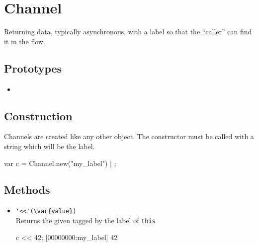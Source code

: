 \section{Channel}
Returning data, typically asynchronous, with a label so that the
``caller'' can find it in the flow.

\subsection{Prototypes}

\begin{itemize}
\item {}
\end{itemize}

\subsection{Construction}

Channels are created like any other object. The constructor must be
called with a string which will be the label.

\begin{urbiscript}
var c = Channel.new("my_label") | {};
\end{urbiscript}

\subsection{Methods}

\begin{itemize}

\item \lstinline|'<<'(\var{value})|\\
Returns the given  tagged by the label of \lstinline|this|

\begin{urbiscript}[firstnumber=last]
c << 42;
[00000000:my_label] 42
\end{urbiscript}

\end{itemize}

